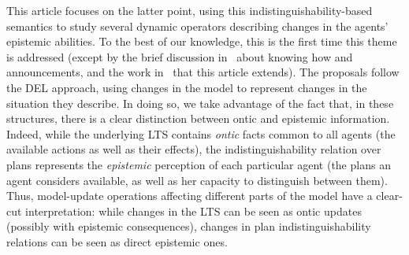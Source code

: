 %
%
%



This article focuses on the latter point, using this in\-dis\-tin\-guisha\-bil\-i\-ty-based semantics to study several dynamic operators describing changes in the agents' epistemic abilities. To the best of our knowledge, this is the first time this theme is addressed (except by the brief discussion in~\cite{Wang2016} about knowing how and announcements, and the work in~\cite{AFSV22} that this article extends). The proposals follow the DEL approach, using changes in the model to represent changes in the situation they describe. In doing so, we take advantage of the fact that, in these structures, there is a clear distinction between ontic and epistemic information. Indeed, while the underlying LTS contains \emph{ontic} facts common to all agents (the available actions as well as their effects), the indistinguishability relation over plans represents the \emph{epistemic} perception of each particular agent (the plans an agent considers available, as well as her capacity to distinguish between them). Thus, model-update operations affecting different parts of the model have a clear-cut interpretation: while changes in the LTS can be seen as ontic updates (possibly with epistemic consequences), changes in plan indistinguishability relations can be seen as direct epistemic ones. 


